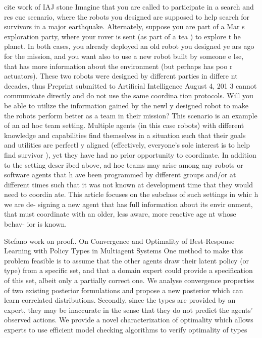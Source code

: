 cite work of IAJ stone 
Imagine that you are called to participate in a search and res cue scenario, where the robots you designed are supposed to help search for survivors in a major earthquake. Alternately, suppose you are part of a Mar s exploration party, where your rover is sent (as part of a tea ) to explore t he planet. In both cases, you already deployed an old robot you designed ye ars ago for the mission, and you want also to use a new robot built by someone e lse, that has more information about the environment (but perhaps has poo r actuators). These two robots were designed by different parties in differe nt decades, thus Preprint submitted to Artificial Intelligence August 4, 201 3 cannot communicate directly and do not use the same coordina tion protocols. Will you be able to utilize the information gained by the newl y designed robot to make the robots perform better as a team in their mission? This scenario is an example of an ad hoc team setting. Multiple agents (in this case robots) with different knowledge and capabilities find themselves in a situation such that their goals and utilities are perfectl y aligned (effectively, everyone’s sole interest is to help find survivor ), yet they have had no prior opportunity to coordinate. In addition to the setting descr ibed above, ad hoc teams may arise among any robots or software agents that h ave been programmed by different groups and/or at different times such that it was not known at development time that they would need to coordin ate. This article focuses on the subclass of such settings in whic h we are de- signing a new agent that has full information about its envir onment, that must coordinate with an older, less aware, more reactive age nt whose behav- ior is known.



Stefano work on proof.. \cite{albrecht2014uai}
On Convergence and Optimality of Best-Response Learning with Policy Types in Multiagent Systems
One method to make this problem feasible is to assume that the other agents draw their latent policy (or type) from a specific set, and that a domain expert could provide a specification of this set, albeit only a partially correct one. We analyse convergence properties of two existing posterior formulations and propose a new posterior which can learn correlated distributions. Secondly, since the types are provided by an expert, they may be inaccurate in the sense that they do not predict the agents' observed actions. We provide a novel characterization of optimality which allows experts to use efficient model checking algorithms to verify optimality of types


